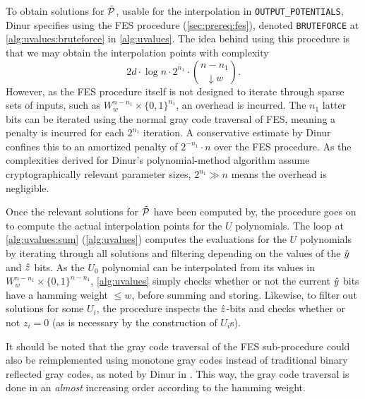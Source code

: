 To obtain solutions for $\Tilde{\mathcal{P}}$, usable for the interpolation in \texttt{OUTPUT\_POTENTIALS}, Dinur specifies using the FES procedure (\cref{sec:prereq:fes}), denoted \texttt{BRUTEFORCE} at \cref{alg:uvalues:bruteforce} in \cref{alg:uvalues}. The idea behind using this procedure is that we may obtain the interpolation points with complexity 
$$
    2d \cdot \log n \cdot 2^{n_1} \cdot \binom{n - n_1}{\downarrow w}.
$$
However, as the FES procedure itself is not designed to iterate through sparse sets of inputs, such as $W^{n - n_1}_w \times \{0, 1\}^{n_1}$, an overhead is incurred. The $n_1$ latter bits can be iterated using the normal gray code traversal of FES, meaning a penalty is incurred for each $2^{n_1}$ iteration. A conservative estimate by Dinur confines this to an amortized penalty of $2^{- n_1} \cdot n$ over the FES procedure. As the complexities derived for Dinur's polynomial-method algorithm assume cryptographically relevant parameter sizes, $2^{n_1} \gg n$ means the overhead is negligible.

Once the relevant solutions for $\Tilde{\mathcal{P}}$ have been computed by, the procedure goes on to compute the actual interpolation points for the $U$ polynomials. The loop at \cref{alg:uvalues:sum} (\cref{alg:uvalues}) computes the evaluations for the $U$ polynomials by iterating through all solutions and filtering depending on the values of the $\Hat{y}$ and $\Hat{z}$ bits. As the $U_0$ polynomial can be interpolated from its values in $W^{n - n_1}_w \times \{0, 1\}^{n - n_1}$, \cref{alg:uvalues} simply checks whether or not the current $\Hat{y}$ bits have a hamming weight $\leq w$, before summing and storing. Likewise, to filter out solutions for some $U_i$, the procedure inspects the $\Hat{z}$-bits and checks whether or not $z_i = 0$ (as is necessary by the construction of $U_i$s).

It should be noted that the gray code traversal of the FES sub-procedure could also be reimplemented using monotone gray codes instead of traditional binary reflected gray codes, as noted by Dinur in \cite{eurocrypt-2021-30841}. This way, the gray code traversal is done in an \textit{almost} increasing order according to the hamming weight.

